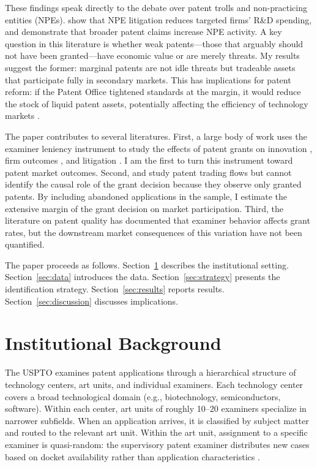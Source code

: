 \documentclass[12pt]{article}
\begin{document}
These findings speak directly to the debate over patent trolls and non-practicing entities (NPEs). \citet{cohen2019patent} show that NPE litigation reduces targeted firms' R\&D spending, and \citet{feng2020crafting} demonstrate that broader patent claims increase NPE activity. A key question in this literature is whether weak patents---those that arguably should not have been granted---have economic value or are merely threats. My results suggest the former: marginal patents are not idle threats but tradeable assets that participate fully in secondary markets. This has implications for patent reform: if the Patent Office tightened standards at the margin, it would reduce the stock of liquid patent assets, potentially affecting the efficiency of technology markets \citep{galasso2011market, serrano2010dynamics}.

The paper contributes to several literatures. First, a large body of work uses the examiner leniency instrument to study the effects of patent grants on innovation \citep{sampat2019patents, galasso2015patents}, firm outcomes \citep{farremensa2020patent}, and litigation \citep{feng2020crafting}. I am the first to turn this instrument toward patent market outcomes. Second, \citet{serrano2010dynamics} and \citet{figueroa2019patent} study patent trading flows but cannot identify the causal role of the grant decision because they observe only granted patents. By including abandoned applications in the sample, I estimate the extensive margin of the grant decision on market participation. Third, the literature on patent quality \citep{frakes2017time, frakes2019irrational, lemley2001rational} has documented that examiner behavior affects grant rates, but the downstream market consequences of this variation have not been quantified.

The paper proceeds as follows. Section~\ref{sec:background} describes the institutional setting. Section~\ref{sec:data} introduces the data. Section~\ref{sec:strategy} presents the identification strategy. Section~\ref{sec:results} reports results. Section~\ref{sec:discussion} discusses implications.


\section{Institutional Background}
\label{sec:background}

The USPTO examines patent applications through a hierarchical structure of technology centers, art units, and individual examiners. Each technology center covers a broad technological domain (e.g., biotechnology, semiconductors, software). Within each center, art units of roughly 10--20 examiners specialize in narrower subfields. When an application arrives, it is classified by subject matter and routed to the relevant art unit. Within the art unit, assignment to a specific examiner is quasi-random: the supervisory patent examiner distributes new cases based on docket availability rather than application characteristics \citep{cockburn2003economic, sampat2019patents}.
\end{document}
